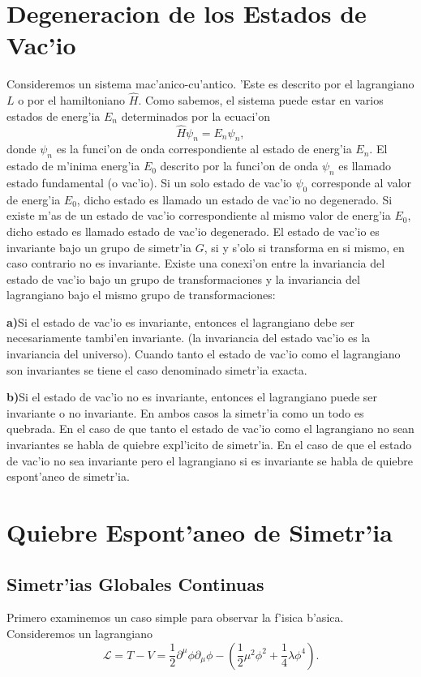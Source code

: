 \section{Degeneracion de los Estados de Vac'io}
Consideremos un sistema mac'anico-cu'antico. 'Este es descrito por el lagrangiano $L$ o por el hamiltoniano $\widehat{H}$. Como sabemos, el sistema puede estar en varios estados de energ'ia $E_n$ determinados por la ecuaci'on
\begin{equation}
\widehat{H} \psi_n = E_n \psi_n,
\end{equation}
donde $\psi_n$ es la funci'on de onda correspondiente al estado de energ'ia $E_n$. El estado de m'inima energ'ia $E_0$  descrito por la funci'on de onda $\psi_n$ es llamado estado fundamental (o vac'io).
Si un solo estado de vac'io $\psi_0$ corresponde al valor de energ'ia $E_0$, dicho estado es llamado un estado de vac'io no degenerado. Si existe m'as de un estado de vac'io correspondiente al mismo valor de energ'ia $E_0$, dicho estado es llamado estado de vac'io degenerado. El estado de vac'io es invariante bajo un grupo de simetr'ia $G$, si y s'olo si transforma en si mismo, en caso contrario no es invariante.
Existe una conexi'on entre la invariancia del estado de vac'io bajo un grupo de transformaciones y la invariancia del lagrangiano bajo el mismo grupo de transformaciones:
\begin{description}
\item \textbf{a)}\quad Si el estado de vac'io es invariante, entonces el lagrangiano debe ser necesariamente
tambi'en invariante. (la invariancia del estado vac'io es la invariancia del universo).
Cuando tanto el estado de vac'io como el lagrangiano son invariantes se tiene el caso
denominado simetr'ia exacta.
\item \textbf{b)}\quad Si el estado de vac'io no es invariante, entonces el lagrangiano puede ser invariante o
no invariante. En ambos casos la simetr'ia como un todo es quebrada. En el caso de
que tanto el estado de vac'io como el lagrangiano no sean invariantes se habla de
quiebre expl'icito de simetr'ia. En el caso de que el estado de vac'io no sea invariante
pero el lagrangiano si es invariante se habla de quiebre espont'aneo de simetr'ia.
\end{description}

\section{Quiebre Espont'aneo de Simetr'ia}
\subsection{Simetr'ias Globales Continuas}\label{subseccion1}
Primero examinemos un caso simple para observar la f'isica b'asica. Consideremos un lagrangiano
\begin{equation}
\mathcal{L}=T-V=\frac{1}{2}\partial^{\mu}\phi\partial_{\mu}\phi-\left(\frac{1}{2}\mu^{2}\phi^{2}+\frac{1}{4}\lambda\phi^{4}\right).
\end{equation} 

